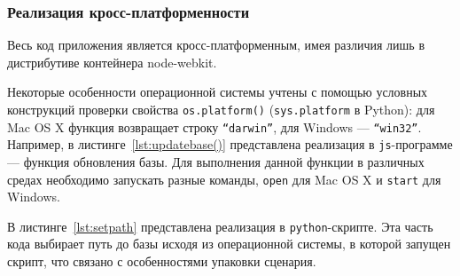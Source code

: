 \subsubsection{Реализация кросс-платформенности}

Весь код приложения является кросс-платформенным, имея различия лишь в дистрибутиве контейнера node-webkit.

Некоторые особенности операционной системы учтены с помощью условных конструкций проверки свойства \texttt{os.platform()} (\texttt{sys.platform} в Python): для Mac OS X функция возвращает строку \texttt{``darwin''}, для Windows --- \texttt{``win32''}. Например, в листинге~\ref{lst:updatebase()} представлена реализация в \texttt{js}-программе --- функция обновления базы. Для выполнения данной функции в различных средах необходимо запускать разные команды, \texttt{open} для Mac OS X и \texttt{start} для Windows.


В листинге~\ref{lst:setpath} представлена реализация в \texttt{python}-скрипте. Эта часть кода выбирает путь до базы исходя из операционной системы, в которой запущен скрипт, что связано с особенностями упаковки сценария.


